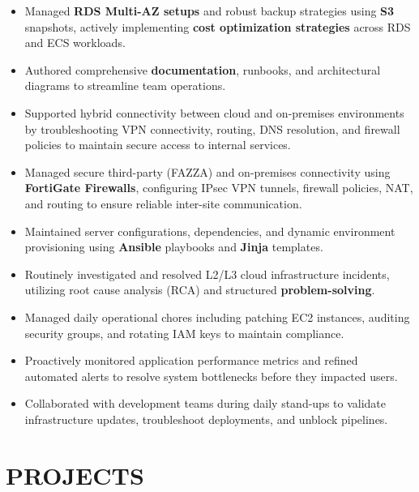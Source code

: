 \documentclass[10pt,a4paper]{article}
\begin{document}
\begin{itemize}[label={\color{teal}\textbullet},leftmargin=*,itemsep=5pt,parsep=2pt,topsep=2pt]
\item Managed \textbf{RDS Multi-AZ setups} and robust backup strategies using \textbf{S3} snapshots, actively implementing \textbf{cost optimization strategies} across RDS and ECS workloads.
\item Authored comprehensive \textbf{documentation}, runbooks, and architectural diagrams to streamline team operations.
\item Supported hybrid connectivity between cloud and on-premises environments by troubleshooting VPN connectivity, routing, DNS resolution, and firewall policies to maintain secure access to internal services.
\item Managed secure third-party (FAZZA) and on-premises connectivity using \textbf{FortiGate Firewalls}, configuring IPsec VPN tunnels, firewall policies, NAT, and routing to ensure reliable inter-site communication.
\item Maintained server configurations, dependencies, and dynamic environment provisioning using \textbf{Ansible} playbooks and \textbf{Jinja} templates.
\item Routinely investigated and resolved L2/L3 cloud infrastructure incidents, utilizing root cause analysis (RCA) and structured \textbf{problem-solving}.
\item Managed daily operational chores including patching EC2 instances, auditing security groups, and rotating IAM keys to maintain compliance.
\item Proactively monitored application performance metrics and refined automated alerts to resolve system bottlenecks before they impacted users.
\item Collaborated with development teams during daily stand-ups to validate infrastructure updates, troubleshoot deployments, and unblock pipelines.
\end{itemize}


\section*{PROJECTS}
\end{document}
